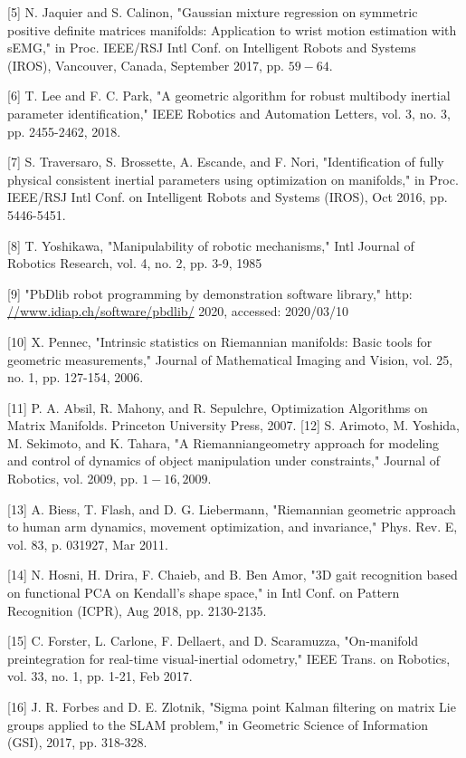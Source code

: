 \documentclass[10pt]{article}
\begin{document}
[5] N. Jaquier and S. Calinon, "Gaussian mixture regression on symmetric positive definite matrices manifolds: Application to wrist motion estimation with sEMG," in Proc. IEEE/RSJ Intl Conf. on Intelligent Robots and Systems (IROS), Vancouver, Canada, September 2017, pp. $59-64$.

[6] T. Lee and F. C. Park, "A geometric algorithm for robust multibody inertial parameter identification," IEEE Robotics and Automation Letters, vol. 3, no. 3, pp. 2455-2462, 2018.

[7] S. Traversaro, S. Brossette, A. Escande, and F. Nori, "Identification of fully physical consistent inertial parameters using optimization on manifolds," in Proc. IEEE/RSJ Intl Conf. on Intelligent Robots and Systems (IROS), Oct 2016, pp. 5446-5451.

[8] T. Yoshikawa, "Manipulability of robotic mechanisms," Intl Journal of Robotics Research, vol. 4, no. 2, pp. 3-9, 1985

[9] "PbDlib robot programming by demonstration software library," http: \href{//www.idiap.ch/software/pbdlib/}{//www.idiap.ch/software/pbdlib/} 2020, accessed: 2020/03/10

[10] X. Pennec, "Intrinsic statistics on Riemannian manifolds: Basic tools for geometric measurements," Journal of Mathematical Imaging and Vision, vol. 25, no. 1, pp. 127-154, 2006.

[11] P. A. Absil, R. Mahony, and R. Sepulchre, Optimization Algorithms on Matrix Manifolds. Princeton University Press, 2007. [12] S. Arimoto, M. Yoshida, M. Sekimoto, and K. Tahara, "A Riemanniangeometry approach for modeling and control of dynamics of object manipulation under constraints," Journal of Robotics, vol. 2009, pp. $1-16,2009$.

[13] A. Biess, T. Flash, and D. G. Liebermann, "Riemannian geometric approach to human arm dynamics, movement optimization, and invariance," Phys. Rev. E, vol. 83, p. 031927, Mar 2011.

[14] N. Hosni, H. Drira, F. Chaieb, and B. Ben Amor, "3D gait recognition based on functional PCA on Kendall's shape space," in Intl Conf. on Pattern Recognition (ICPR), Aug 2018, pp. 2130-2135.

[15] C. Forster, L. Carlone, F. Dellaert, and D. Scaramuzza, "On-manifold preintegration for real-time visual-inertial odometry," IEEE Trans. on Robotics, vol. 33, no. 1, pp. 1-21, Feb 2017.

[16] J. R. Forbes and D. E. Zlotnik, "Sigma point Kalman filtering on matrix Lie groups applied to the SLAM problem," in Geometric Science of Information (GSI), 2017, pp. 318-328.
\end{document}
